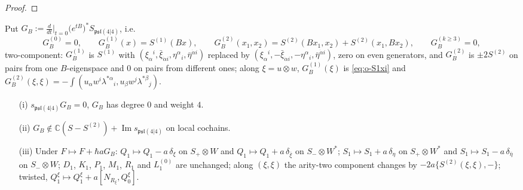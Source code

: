 \begin{proof}
\end{proof}

\begin{proposition}
\label{prop:o-GB}
Put $G_B:=\frac{d}{dt}\big|_{t=0}\big(e^{tB}\big)^*S_{\mathfrak{psl}(4|4)}$, i.e.
\[
G_B^{(0)}=0,\qquad G_B^{(1)}(x)=S^{(1)}(Bx),\qquad G_B^{(2)}(x_1,x_2)=S^{(2)}(Bx_1,x_2)+S^{(2)}(x_1,Bx_2),\qquad G_B^{(k\ge3)}=0,
\]
two-component: $G_B^{(1)}$ is $S^{(1)}$ with $(\xi_\alpha{}^i,\bar\xi_{\dot\alpha i},\eta^\alpha{}_i,\bar\eta^{\dot\alpha i})$ replaced by $(\xi_\alpha{}^i,-\bar\xi_{\dot\alpha i},-\eta^\alpha{}_i,\bar\eta^{\dot\alpha i})$, zero on even generators, and $G_B^{(2)}$ is $\pm2S^{(2)}$ on pairs from one $B$-eigenspace and $0$ on pairs from different ones; along $\xi=u\otimes w$, $G_B^{(1)}(\xi)$ is \eqref{eq:o-S1xi} and $G_B^{(2)}(\xi,\xi)=-\int(u_\alpha w^i\lambda^{*\alpha}{}_i,u_\beta w^j\lambda^{*\beta}{}_j)$.
\begin{itemize}
\item[(i)] $s_{\mathfrak{psl}(4|4)}G_B=0$, $G_B$ has degree $0$ and weight $4$.
\item[(ii)] $G_B\notin\mathbb C(S-S^{(2)})+\operatorname{Im}s_{\mathfrak{psl}(4|4)}$ on local cochains.
\item[(iii)] Under $F\mapsto F+\hbar aG_B$: $Q_1\mapsto Q_1-a\,\delta_\xi$ on $S_+\otimes W$ and $Q_1\mapsto Q_1+a\,\delta_{\bar\xi}$ on $S_-\otimes W^*$; $S_1\mapsto S_1+a\,\delta_\eta$ on $S_+\otimes W^*$ and $S_1\mapsto S_1-a\,\delta_{\bar\eta}$ on $S_-\otimes W$; $D_1$, $K_1$, $P_1$, $M_1$, $R_1$ and $L_1^{(0)}$ are unchanged; along $(\xi,\xi)$ the arity-two component changes by $-2a\{S^{(2)}(\xi,\xi),-\}$; twisted, $Q_1^\xi\mapsto Q_1^\xi+a[N_{R_\xi},Q_0^\xi]$.
\end{itemize}
\end{proposition}

